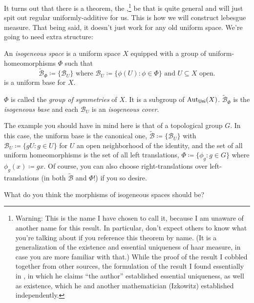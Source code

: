 It turns out that there is a theorem, the ,\footnote{Warning:  This is the name I have chosen to call it, because I am unaware of another name for this result.  In particular, don't expect others to know what you're talking about if you reference this theorem by name.  (It is a generalization of the existence and essential uniqueness of haar measure, in case you are more familiar with that.)  While the proof of the result I cobbled together from other sources, the formulation of the result I found essentially in \cite{Howes}, in which he claims ``the author'' established essential uniqueness, as well as existence, which he and another mathematician (Izkowitz) established independently.}  be that is quite general and will just spit out regular uniformly-additive for us.  This is how we will construct lebesgue measure.  That being said, it doesn't just work for any old uniform space.  We're going to need extra structure:
\begin{dfn}\label{IsogeneousSpace}
An \emph{isogeneous space} is a uniform space $X$ equipped with a group of uniform-homeomorphisms $\Phi$ such that
\begin{equation}\label{5.1.28}
\widetilde{\mathcal{B}}_\Phi \coloneqq \{ \mathcal{B}_U\} \text{ where }\mathcal{B}_U\coloneqq \{ \phi (U):\phi \in \Phi\} \text{ and }U\subseteq X\text{ open}.
\end{equation}
is a uniform base for $X$.
\begin{rmk}
$\Phi$ is called the \emph{group of symmetries} of $X$.  It is a subgroup of $\operatorname{Aut} _{\mathsf{Uni}}(X)$.  $\widetilde{\mathcal{B}}_{\Phi}$ is the \emph{isogeneous base} and each $\mathcal{B}_U$ is an \emph{isogeneous cover}.
\end{rmk}
\begin{rmk}
The example you should have in mind here is that of a topological group $G$.  In this case, the uniform base is the canonical one, $\widetilde{\mathcal{B}}\coloneqq \{ \mathcal{B}_U\}$ with $\mathcal{B}_U\coloneqq \{ gU:g\in U\}$ for $U$ an open neighborhood of the identity, and the set of all uniform homeomorphisms is the set of all left translations, $\Phi \coloneqq \{ \phi _g:g\in G\}$ where $\phi _g(x)\coloneqq gx$.  Of course, you can also choose right-translations over left-translations (in both $\widetilde{\mathcal{B}}$ and $\Phi$!) if you so desire.
\end{rmk}
\begin{rmk}
What do you think the morphisms of isogeneous spaces should be?
\end{rmk}
\end{dfn}
